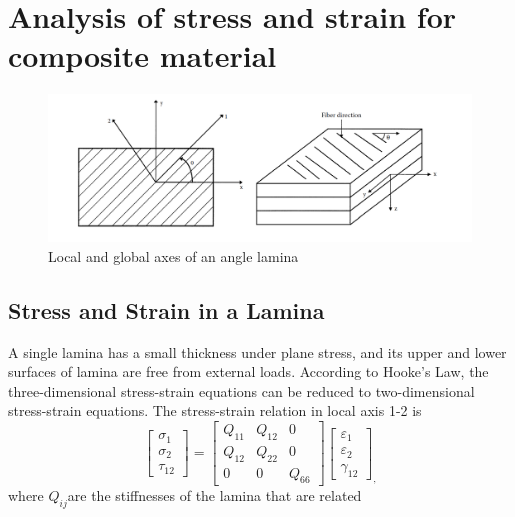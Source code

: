 \section{Analysis of stress and strain for composite material}

\begin{figure}[tb]
	\centering
	\includegraphics[width=\linewidth]{image/lamina_local_global_axes.png}
\caption{Local and global axes of an angle lamina}
  	\label{fig:lamina}
\end{figure}

\subsection{Stress and Strain in a Lamina}
A single lamina has a small thickness under plane stress, and its upper and lower surfaces of lamina are
free from external loads. According to Hooke's Law, the three-dimensional stress-strain equations can be reduced to
two-dimensional stress-strain equations. The stress-strain relation in local axis 1-2 is
\begin{equation}
    \begin{bmatrix}
        \sigma _1\\
        \sigma _2\\
        \tau_{12}
    \end{bmatrix}
    =
    \begin{bmatrix}
        Q_{11} & Q_{12} & 0\\
        Q_{12} & Q_{22} & 0\\
        0      &  0     & Q_{66}
    \end{bmatrix}
    \begin{bmatrix}
        \varepsilon_1\\
        \varepsilon_2\\\gamma_{12}
	\end{bmatrix}_{\textstyle ,} 
\end{equation}
where $Q_{ij} $are the stiffnesses of the lamina that are related

